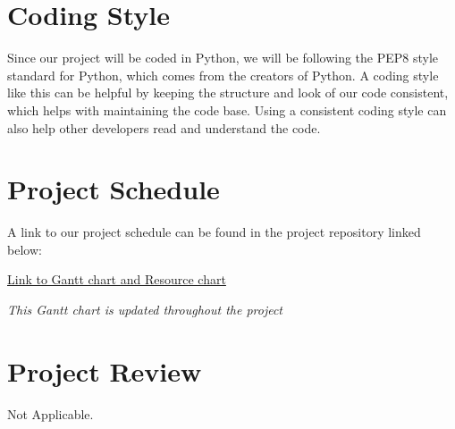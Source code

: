 \documentclass{article}
\begin{document}
\section{Coding Style}

Since our project will be coded in Python, we will be following the PEP8
style standard for Python, which comes from the creators of Python. 
A coding style like this can be helpful by keeping the structure and look of
our code consistent, which helps with maintaining the code base. Using a 
consistent coding style can also help other developers read and understand the 
code.

\section{Project Schedule}
A link to our project schedule can be found in the project repository linked below:

\href{https://gitlab.cas.mcmaster.ca/jandricd/super-refactored-mario-bros/tree/master/ProjectSchedule}{Link to Gantt chart and Resource chart}

{\it This Gantt chart is updated throughout the project}


\section{Project Review}
Not Applicable.
\end{document}
